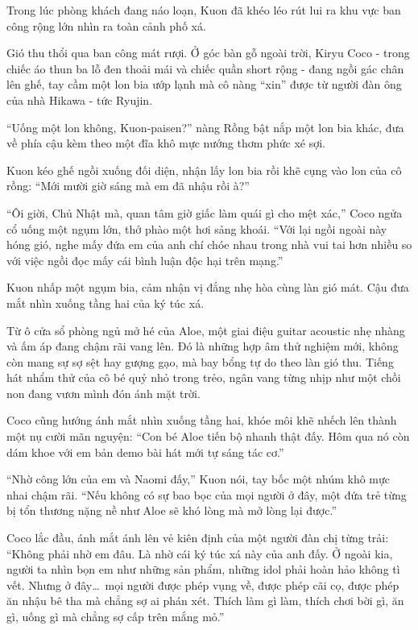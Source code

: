 ﻿\documentclass[../main.tex]{subfiles}
\begin{document}
\ct

Trong lúc phòng khách đang náo loạn, Kuon đã khéo léo rút lui ra khu vực ban công rộng lớn nhìn ra toàn cảnh phố xá.

Gió thu thổi qua ban công mát rượi. Ở góc bàn gỗ ngoài trời, Kiryu Coco - trong chiếc áo thun ba lỗ đen thoải mái và chiếc quần short rộng - đang ngồi gác chân lên ghế, tay cầm một lon bia ướp lạnh mà cô nàng ``xin'' được từ người đàn ông của nhà Hikawa - tức Ryujin.

``Uống một lon không, Kuon-paisen?'' nàng Rồng bật nắp một lon bia khác, đưa về phía cậu kèm theo một đĩa khô mực nướng thơm phức xé sợi.

Kuon kéo ghế ngồi xuống đối diện, nhận lấy lon bia rồi khẽ cụng vào lon của cô rồng: ``Mới mười giờ sáng mà em đã nhậu rồi à?''

``Ôi giời, Chủ Nhật mà, quan tâm giờ giấc làm quái gì cho mệt xác,'' Coco ngửa cổ uống một ngụm lớn, thở phào một hơi sảng khoái. ``Với lại ngồi ngoài này hóng gió, nghe mấy đứa em của anh chí chóe nhau trong nhà vui tai hơn nhiều so với việc ngồi đọc mấy cái bình luận độc hại trên mạng.''

Kuon nhấp một ngụm bia, cảm nhận vị đắng nhẹ hòa cùng làn gió mát. Cậu đưa mắt nhìn xuống tầng hai của ký túc xá.

Từ ô cửa sổ phòng ngủ mở hé của Aloe, một giai điệu guitar acoustic nhẹ nhàng và ấm áp đang chậm rãi vang lên. Đó là những hợp âm thử nghiệm mới, không còn mang sự sợ sệt hay gượng gạo, mà bay bổng tự do theo làn gió thu. Tiếng hát nhẩm thử của cô bé quỷ nhỏ trong trẻo, ngân vang từng nhịp như một chồi non đang vươn mình đón ánh mặt trời.

Coco cũng hướng ánh mắt nhìn xuống tầng hai, khóe môi khẽ nhếch lên thành một nụ cười mãn nguyện: ``Con bé Aloe tiến bộ nhanh thật đấy. Hôm qua nó còn dám khoe với em bản demo bài hát mới tự sáng tác cơ.''

``Nhờ công lớn của em và Naomi đấy,'' Kuon nói, tay bốc một nhúm khô mực nhai chậm rãi. ``Nếu không có sự bao bọc của mọi người ở đây, một đứa trẻ từng bị tổn thương nặng nề như Aloe sẽ khó lòng mà mở lòng lại được.''

Coco lắc đầu, ánh mắt ánh lên vẻ kiên định của một người đàn chị từng trải: ``Không phải nhờ em đâu. Là nhờ cái ký túc xá này của anh đấy. Ở ngoài kia, người ta nhìn bọn em như những sản phẩm, những idol phải hoàn hảo không tì vết. Nhưng ở đây\dots\ mọi người được phép vụng về, được phép cãi cọ, được phép ăn nhậu bê tha mà chẳng sợ ai phán xét. Thích làm gì làm, thích chơi bời gì, ăn gì, uống gì mà chẳng sợ cấp trên mắng mỏ.''
\end{document}
